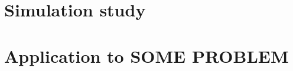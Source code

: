 \documentclass[a4paper]{report}
\begin{document}

\section{Simulation study} %
\label{sec:simulation_study_multifractals}


\section{Application to \textbf{SOME PROBLEM}} %
\label{sec:application_to_some_problem}




\clearpage
{}



% 
\end{document}
